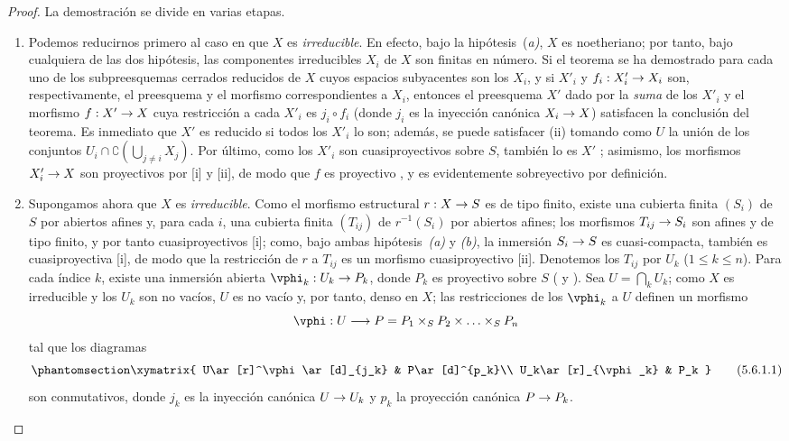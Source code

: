 \documentclass[oneside,10pt]{amsart}
\makeatletter
\renewcommand{\leq}{\leqslant}
\newcommand{\ega@arrow}[2]{\mathchoice{#1}{#2}{#2}{#2}}
\renewcommand{\to}{\ega@arrow{\longrightarrow}{\rightarrow}}
\newcommand{\oldpage}[2][]{\marginnote{\normalfont\footnotesize\textbf{#1}~|~#2}\ignorespaces}
\let\EGAOriginalLabel\label
\renewcommand{\label}[1]{\phantomsection\EGAOriginalLabel{#1}}
\makeatother
\begin{document}
\begin{proof}
La demostración se divide en varias etapas.
\begin{enumerate}
  \item[(A)] Podemos reducirnos primero al caso en que $X$ es \emph{irreducible}.
    En efecto, bajo la hipótesis~(\emph{a)}, $X$ es noetheriano; por tanto, bajo cualquiera de las dos hipótesis, las componentes irreducibles $X_i$ de $X$ son finitas en número.
    Si el teorema se ha demostrado para cada uno de los subpreesquemas cerrados reducidos de $X$ cuyos espacios subyacentes son los $X_i$, y si $X'_i$ y $f_i:X'_i\to X_i$ son, respectivamente, el preesquema y el morfismo correspondientes a $X_i$, entonces el preesquema $X'$ dado por la \emph{suma} de los $X'_i$ y el morfismo $f:X'\to X$ cuya restricción a cada $X'_i$ es $j_i\circ f_i$ (donde $j_i$ es la inyección canónica $X_i\to X$) satisfacen la conclusión del teorema.
    Es inmediato que $X'$ es reducido si todos los $X'_i$ lo son; además, se puede satisfacer (ii) tomando como $U$ la unión de los conjuntos $U_i\cap\complement\left(\bigcup_{j\neq i}X_j\right)$.
    Por último, como los $X'_i$ son cuasiproyectivos sobre $S$, también lo es $X'$
\oldpage[II]{107}
    ; asimismo, los morfismos $X'_i\to X$ son proyectivos por [i] y [ii], de modo que $f$ es proyectivo , y es evidentemente sobreyectivo por definición.

  \item[(B)] Supongamos ahora que $X$ es \emph{irreducible}.
    Como el morfismo estructural $r:X\to S$ es de tipo finito, existe una cubierta finita $(S_i)$ de $S$ por abiertos afines y, para cada $i$, una cubierta finita $(T_{ij})$ de $r^{-1}(S_i)$ por abiertos afines; los morfismos $T_{ij}\to S_i$ son afines y de tipo finito, y por tanto cuasiproyectivos [i];
    como, bajo ambas hipótesis~\emph{(a)} y \emph{(b)}, la inmersión $S_i\to S$ es cuasi-compacta, también es cuasiproyectiva [i], de modo que la restricción de $r$ a $T_{ij}$ es un morfismo cuasiproyectivo [ii].
    Denotemos los $T_{ij}$ por $U_k$ ($1\leq k\leq n$).
    Para cada índice $k$, existe una inmersión abierta $\vphi_k:U_k\to P_k$, donde $P_k$ es proyectivo sobre $S$ ( y ).
    Sea $U=\bigcap_k U_k$; como $X$ es irreducible y los $U_k$ son no vacíos, $U$ es no vacío y, por tanto, denso en $X$; las restricciones de los $\vphi_k$ a $U$ definen un morfismo
    \[
      \vphi:U\to P=P_1\times_S P_2\times\ldots\times_S P_n
    \]
    tal que los diagramas
    \[
    \label{II.5.6.1.1}
      \xymatrix{
        U\ar[r]^\vphi\ar[d]_{j_k} &
        P\ar[d]^{p_k}\\
        U_k\ar[r]_{\vphi_k} &
        P_k
      }
      \tag{5.6.1.1}
    \]
    son conmutativos, donde $j_k$ es la inyección canónica $U\to U_k$ y $p_k$ la proyección canónica $P\to P_k$.


\end{enumerate}
\end{proof}
\end{document}
